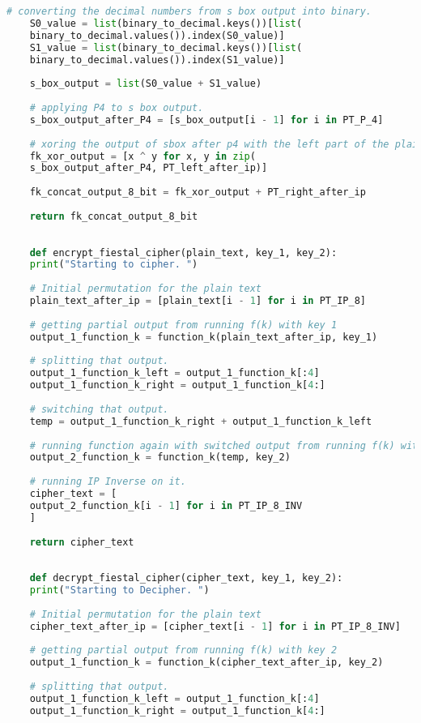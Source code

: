 \documentclass{article}
\begin{document}
\begin{lstlisting}[language=python, caption={Input Code}]
	# converting the decimal numbers from s box output into binary.
	S0_value = list(binary_to_decimal.keys())[list(
	binary_to_decimal.values()).index(S0_value)]
	S1_value = list(binary_to_decimal.keys())[list(
	binary_to_decimal.values()).index(S1_value)]
	
	s_box_output = list(S0_value + S1_value)
	
	# applying P4 to s box output.
	s_box_output_after_P4 = [s_box_output[i - 1] for i in PT_P_4]
	
	# xoring the output of sbox after p4 with the left part of the plain text after ip.
	fk_xor_output = [x ^ y for x, y in zip(
	s_box_output_after_P4, PT_left_after_ip)]
	
	fk_concat_output_8_bit = fk_xor_output + PT_right_after_ip
	
	return fk_concat_output_8_bit
	
	
	def encrypt_fiestal_cipher(plain_text, key_1, key_2):
	print("Starting to cipher. ")
	
	# Initial permutation for the plain text
	plain_text_after_ip = [plain_text[i - 1] for i in PT_IP_8]
	
	# getting partial output from running f(k) with key 1
	output_1_function_k = function_k(plain_text_after_ip, key_1)
	
	# splitting that output.
	output_1_function_k_left = output_1_function_k[:4]
	output_1_function_k_right = output_1_function_k[4:]
	
	# switching that output.
	temp = output_1_function_k_right + output_1_function_k_left
	
	# running function again with switched output from running f(k) with key 2
	output_2_function_k = function_k(temp, key_2)
	
	# running IP Inverse on it.
	cipher_text = [
	output_2_function_k[i - 1] for i in PT_IP_8_INV
	]
	
	return cipher_text
	
	
	def decrypt_fiestal_cipher(cipher_text, key_1, key_2):
	print("Starting to Decipher. ")
	
	# Initial permutation for the plain text
	cipher_text_after_ip = [cipher_text[i - 1] for i in PT_IP_8_INV]
	
	# getting partial output from running f(k) with key 2
	output_1_function_k = function_k(cipher_text_after_ip, key_2)
	
	# splitting that output.
	output_1_function_k_left = output_1_function_k[:4]
	output_1_function_k_right = output_1_function_k[4:]
	

\end{lstlisting}
\end{document}
